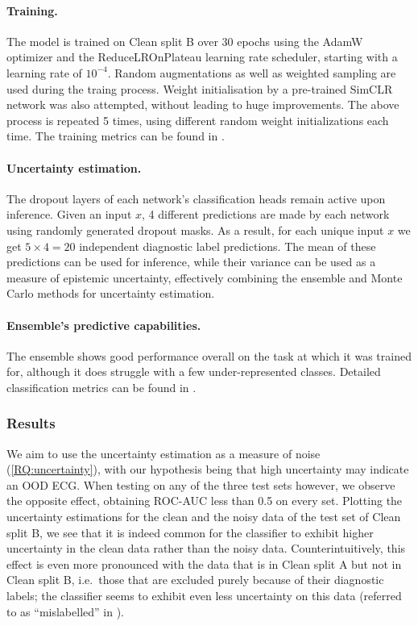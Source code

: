 \documentclass[a4paper,10pt]{article}
\begin{document}
\paragraph{Training.} The model is trained on Clean split B over 30 epochs using the AdamW optimizer and the ReduceLROnPlateau learning rate scheduler, starting with a learning rate of $10^{-4}$. Random augmentations as well as weighted sampling are used during the traing process. Weight initialisation by a pre-trained SimCLR network was also attempted, without leading to huge improvements. The above process is repeated 5 times, using different random weight initializations each time. The training metrics can be found in .

\paragraph{Uncertainty estimation.} The dropout layers of each network's classification heads remain active upon inference. Given an input $x$, 4 different predictions are made by each network using randomly generated dropout masks. As a result, for each unique input $x$ we get $5\times 4 = 20$ independent diagnostic label predictions. The mean of these predictions can be used for inference, while their variance can be used as a measure of epistemic uncertainty, effectively combining the ensemble and Monte Carlo methods for uncertainty estimation.

\paragraph{Ensemble's predictive capabilities.} The ensemble shows good performance overall on the task at which it was trained for, although it does struggle with a few under-represented classes. Detailed classification metrics can be found in .


\subsubsection{Results} We aim to use the uncertainty estimation as a measure of noise (\ref{RQ:uncertainty}), with our hypothesis being that high uncertainty may indicate an OOD ECG. When testing on any of the three test sets however, we observe the opposite effect, obtaining ROC-AUC less than 0.5 on every set. Plotting the uncertainty estimations for the clean and the noisy data of the test set of Clean split B, we see that it is indeed common for the classifier to exhibit higher uncertainty in the clean data rather than the noisy data. Counterintuitively, this effect is even more pronounced with the data that is in Clean split A but not in Clean split B, i.e.\ those that are excluded purely because of their diagnostic labels; the classifier seems to exhibit even less uncertainty on this data (referred to as ``mislabelled'' in ).
\end{document}

